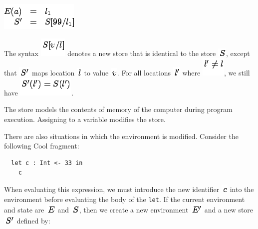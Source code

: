 \documentclass[]{article}
\begin{document}
\includegraphics{img127.png}

The syntax \includegraphics{img128.png} denotes a new store that is
identical to the store \includegraphics{img129.png}, except that
\includegraphics{img126.png} maps location \includegraphics{img130.png}
to value \includegraphics{img59.png}. For all locations
\includegraphics{img131.png} where \includegraphics{img132.png}, we
still have \includegraphics{img133.png}.

The store models the contents of memory of the computer during program
execution. Assigning to a variable modifies the store.

There are also situations in which the environment is modified. Consider
the following Cool fragment:

\begin{verbatim}
  let c : Int <- 33 in
    c
\end{verbatim}

When evaluating this expression, we must introduce the new identifier
\includegraphics{img134.png} into the environment before evaluating the
body of the \texttt{let}. If the current environment and state are
\includegraphics{img125.png} and \includegraphics{img129.png}, then we
create a new environment \includegraphics{img135.png} and a new store
\includegraphics{img126.png} defined by: \\
\end{document}
